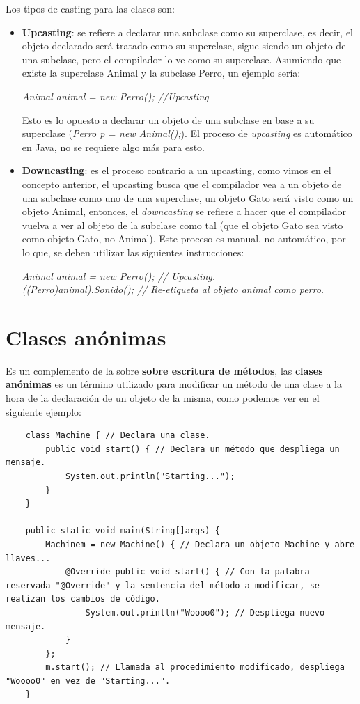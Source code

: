 Los tipos de casting para las clases son:
\begin{itemize}
    \item \textbf{Upcasting}: se refiere a declarar una subclase como su superclase, es decir, el objeto declarado será tratado como su superclase, sigue siendo un objeto de una subclase, pero el compilador lo ve como su            superclase. Asumiendo que existe la superclase Animal y la subclase Perro, un ejemplo sería:
    \begin{center}
		\textit{Animal animal = new Perro(); //Upcasting}
    \end{center}
	Esto es lo opuesto a declarar un objeto de una subclase en base a su superclase (\textit{Perro p = new Animal();}). El proceso de \textit{upcasting} es automático en Java, no se requiere algo más para esto.
    \item \textbf{Downcasting}: es el proceso contrario a un upcasting, como vimos en el concepto anterior, el upcasting busca que el compilador vea a un objeto de una subclase como uno de una superclase, un objeto Gato será visto como un objeto Animal, entonces, el \textit{downcasting} se refiere a hacer que el compilador vuelva a ver al objeto de la subclase como tal (que el objeto Gato sea visto como objeto Gato, no Animal). Este         proceso es manual, no automático, por lo que, se deben utilizar las siguientes instrucciones:
    \begin{center}
		\textit{
			Animal animal = new Perro(); // Upcasting. \\
			((Perro)animal).Sonido(); // Re-etiqueta al objeto animal como perro.
		}
    \end{center}
\end{itemize}



\section{Clases anónimas}
\hspace{0.55cm}Es un complemento de la sobre \textbf{sobre escritura de métodos}, las \textbf{clases anónimas} es un término utilizado para modificar un método de una clase a la hora de la declaración de un objeto de la misma, como podemos ver en el siguiente ejemplo:
\begin{lstlisting}
    class Machine { // Declara una clase.
        public void start() { // Declara un método que despliega un mensaje.
            System.out.println("Starting...");
        }
    }
    
    public static void main(String[]args) {
        Machinem = new Machine() { // Declara un objeto Machine y abre llaves...
            @Override public void start() { // Con la palabra reservada "@Override" y la sentencia del método a modificar, se realizan los cambios de código.
                System.out.println("Woooo0"); // Despliega nuevo mensaje.
            }
        };
        m.start(); // Llamada al procedimiento modificado, despliega "Woooo0" en vez de "Starting...".
    }
\end{lstlisting}

